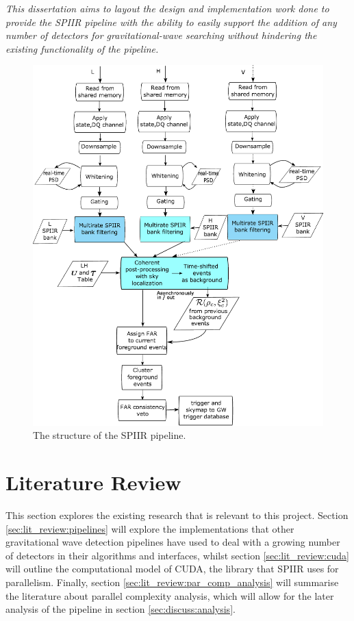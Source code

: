 \documentclass{article}
\begin{document}
\textit{This dissertation aims to layout the design and implementation work done to provide the SPIIR pipeline with the ability to easily support the addition of any number of detectors for gravitational-wave searching without hindering the existing functionality of the pipeline.}

\begin{figure}
    \centering
    \includegraphics[scale=0.18]{../seminar-presentation/online_xdet.jpg}
    \caption{The structure of the SPIIR pipeline.}
    \label{fig:spiir_structure}
\end{figure}

\section{Literature Review} \label{sec:lit_review}

This section explores the existing research that is relevant to this project.
Section \ref{sec:lit_review:pipelines} will explore the implementations that other gravitational wave detection pipelines have used to deal with a growing number of detectors in their algorithms and interfaces, whilst section \ref{sec:lit_review:cuda} will outline the computational model of CUDA, the library that SPIIR uses for parallelism.
Finally, section \ref{sec:lit_review:par_comp_analysis} will summarise the literature about parallel complexity analysis, which will allow for the later analysis of the pipeline in section \ref{sec:discuss:analysis}.
\end{document}
